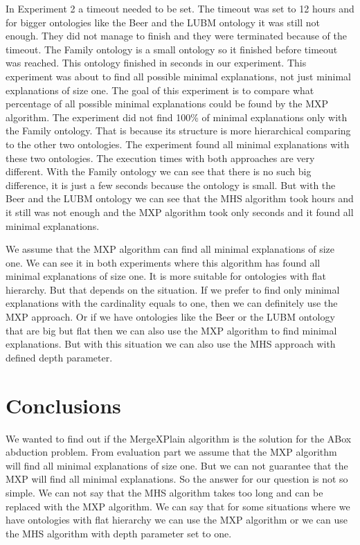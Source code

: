 \documentclass[12pt,a4paper]{article}
\begin{document}
In Experiment 2 a timeout needed to be set. The timeout was set to 12 hours and for bigger ontologies like the Beer and the LUBM ontology it was still not enough. They did not manage to finish and they were terminated because of the timeout. The Family ontology is a small ontology so it finished before timeout was reached. This ontology finished in seconds in our experiment. This experiment was about to find all possible minimal explanations, not just minimal explanations of size one. The goal of this experiment is to compare what percentage of all possible minimal explanations could be found by the MXP algorithm. The experiment did not find 100\% of minimal explanations only with the Family ontology. That is because its structure is more hierarchical comparing to the other two ontologies. The experiment found all minimal explanations with these two ontologies. The execution times with both approaches are very different. With the Family ontology we can see that there is no such big difference, it is just a few seconds because the ontology is small. But with the Beer and the LUBM ontology we can see that the MHS algorithm took hours and it still was not enough and the MXP algorithm took only seconds and it found all minimal explanations.

We assume that the MXP algorithm can find all minimal explanations of size one. We can see it in both experiments where this algorithm has found all minimal explanations of size one. It is more suitable for ontologies with flat hierarchy. But that depends on the situation. If we prefer to find only minimal explanations with the cardinality equals to one, then we can definitely use the MXP approach. Or if we have ontologies like the Beer or the LUBM ontology that are big but flat then we can also use the MXP algorithm to find minimal explanations. But with this situation we can also use the MHS approach with defined depth parameter.

\pagebreak
\section{Conclusions}
We wanted to find out if the MergeXPlain algorithm is the solution for the ABox abduction problem. From evaluation part we assume that the MXP algorithm will find all minimal explanations of size one. But we can not guarantee that the MXP will find all minimal explanations. So the answer for our question is not so simple. We can not say that the MHS algorithm takes too long and can be replaced with the MXP algorithm. We can say that for some situations where we have ontologies with flat hierarchy we can use the MXP algorithm or we can use the MHS algorithm with depth parameter set to one.
\end{document}
